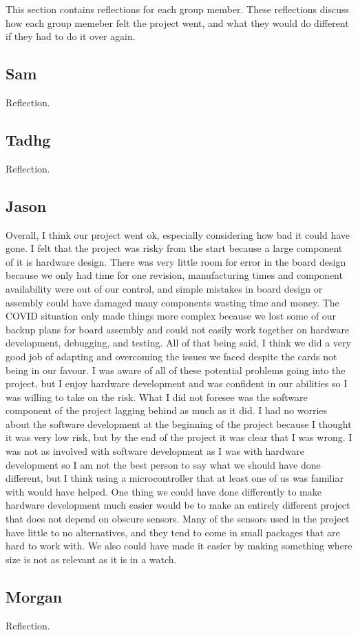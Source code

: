 This section contains reflections for each group member. These reflections
discuss how each group memeber felt the project went, and what they would do
different if they had to do it over again.

\subsection{Sam}

Reflection.

\subsection{Tadhg}

Reflection.

\subsection{Jason}

Overall, I think our project went ok, especially considering how bad it could
have gone. I felt that the project was risky from the start because a large
component of it is hardware design. There was very little room for error in the
board design because we only had time for one revision, manufacturing times
and component availability were out of our control, and simple mistakes in board 
design or assembly could have damaged many components wasting time and money. 
The COVID situation only made things more complex because we lost some of our 
backup plans for board assembly and could not easily work together on hardware 
development, debugging, and testing. All of that being said, I think we did a 
very good job of adapting and overcoming the issues we faced despite the cards 
not being in our favour. I was aware of all of these potential problems going
into the project, but I enjoy hardware development and was confident in our 
abilities so I was willing to take on the risk. What I did not foresee was the
software component of the project lagging behind as much as it did. I had no
worries about the software development at the beginning of the project 
because I thought it was very low risk, but by the end of the project it was
clear that I was wrong. I was not as involved with software development as I was
with hardware development so I am not the best person to say what we should 
have done different, but I think using a microcontroller that at least one of us
was familiar with would have helped. One thing we could have done differently to 
make hardware development much easier would be to make an entirely different 
project that does not depend on obscure sensors. Many of the sensors used in the 
project have little to no alternatives, and they tend to come in small packages 
that are hard to work with. We also could have made it easier by making 
something where size is not as relevant as it is in a watch.

\subsection{Morgan}

Reflection.